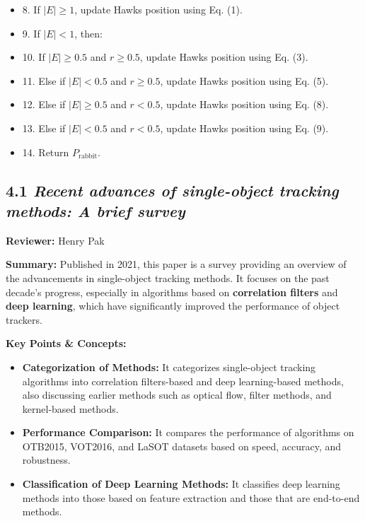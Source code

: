 \documentclass{article}
\begin{document}
\begin{itemize}
\begin{itemize}
      \item 8. If \(|E| \geq 1\), update Hawks position using Eq. (1). 
      \item 9. If \(|E| < 1\), then:  
      \item 10. If \(|E| \geq 0.5\) and \(r \geq 0.5\), update Hawks position using Eq. (3). 
      \item 11. Else if \(|E| < 0.5\) and \(r \geq 0.5\), update Hawks position using Eq. (5).  
      \item 12. Else if \(|E| \geq 0.5\) and \(r < 0.5\), update Hawks position using Eq. (8).  
      \item 13. Else if \(|E| < 0.5\) and \(r < 0.5\), update Hawks position using Eq. (9).  
      \item 14. Return \(P_{\text{rabbit}}\).  
    \end{itemize}
\end{itemize}

\subsection*{4.1 \textit{Recent advances of single-object tracking methods: A brief survey}}

\hspace*{\parindent}\textbf{Reviewer:} Henry Pak

\vspace{0.3cm}

\textbf{Summary:} Published in 2021, this paper is a survey providing an overview of the advancements in single-object tracking methods. It focuses on the past decade's progress, especially in algorithms based on \textbf{correlation filters} and \textbf{deep learning}, which have significantly improved the performance of object trackers.

\vspace{0.3cm}

\textbf{Key Points \& Concepts:}
\begin{itemize}
  \item \textbf{Categorization of Methods:} It categorizes single-object tracking algorithms into correlation filters-based and deep learning-based methods, also discussing earlier methods such as optical flow, filter methods, and kernel-based methods.
  \item \textbf{Performance Comparison:} It compares the performance of algorithms on OTB2015, VOT2016, and LaSOT datasets based on speed, accuracy, and robustness.
  \item \textbf{Classification of Deep Learning Methods:} It classifies deep learning methods into those based on feature extraction and those that are end-to-end methods.
\end{itemize}
\end{document}
